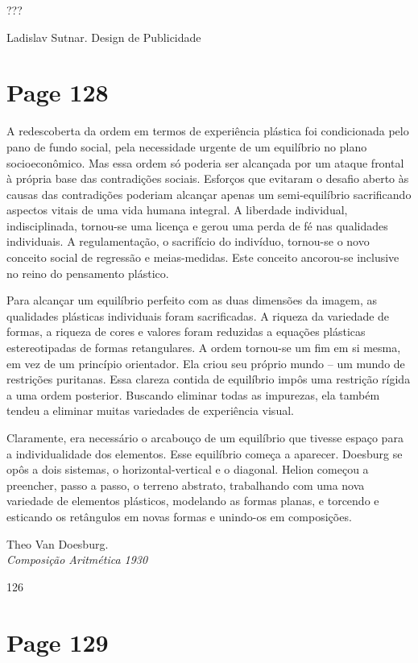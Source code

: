\documentclass[a4paper]{article}
\begin{document}
???

Ladislav Sutnar. Design de Publicidade

\newpage
\section*{Page 128}

A redescoberta da ordem em termos de experiência plástica foi condicionada pelo pano de fundo social, pela necessidade urgente de um equilíbrio no plano socioeconômico. Mas essa ordem só poderia ser alcançada por um ataque frontal à própria base das contradições sociais. Esforços que evitaram o desafio aberto às causas das contradições poderiam alcançar apenas um semi-equilíbrio sacrificando aspectos vitais de uma vida humana integral. A liberdade individual, indisciplinada, tornou-se uma licença e gerou uma perda de fé nas qualidades individuais. A regulamentação, o sacrifício do indivíduo, tornou-se o novo conceito social de regressão e meias-medidas. Este conceito ancorou-se inclusive no reino do pensamento plástico.

Para alcançar um equilíbrio perfeito com as duas dimensões da imagem, as qualidades plásticas individuais foram sacrificadas. A riqueza da variedade de formas, a riqueza de cores e valores foram reduzidas a equações plásticas estereotipadas de formas retangulares. A ordem tornou-se um fim em si mesma, em vez de um princípio orientador. Ela criou seu próprio mundo – um mundo de restrições puritanas. Essa clareza contida de equilíbrio impôs uma restrição rígida a uma ordem posterior. Buscando eliminar todas as impurezas, ela também tendeu a eliminar muitas variedades de experiência visual.

Claramente, era necessário o arcabouço de um equilíbrio que tivesse espaço para a individualidade dos elementos. Esse equilíbrio começa a aparecer. Doesburg se opôs a dois sistemas, o horizontal-vertical e o diagonal. Helion começou a preencher, passo a passo, o terreno abstrato, trabalhando com uma nova variedade de elementos plásticos, modelando as formas planas, e torcendo e esticando os retângulos em novas formas e unindo-os em composições.

\raggedleft
Theo Van Doesburg.\\
\textit{Composição Aritmética 1930}

126

\newpage
\section*{Page 129}
\end{document}
